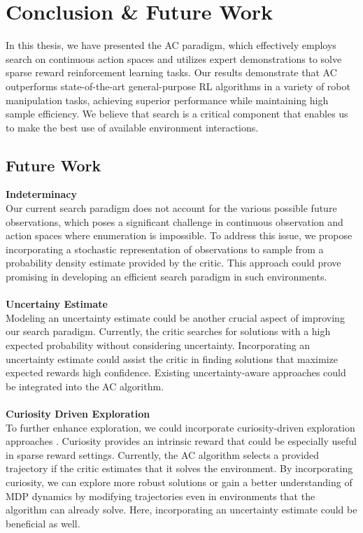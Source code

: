 
\chapter{Conclusion & Future Work}
\label{chapter:Conc_Fut}
In this thesis, we have presented the AC paradigm, which effectively employs search on continuous action spaces and utilizes 
expert demonstrations to solve sparse reward reinforcement learning tasks. Our results demonstrate that AC 
outperforms state-of-the-art general-purpose RL algorithms in a variety of robot manipulation tasks, achieving superior performance 
while maintaining high sample efficiency. We believe that search is a critical component that enables us to make the best use of available 
environment interactions.

\section{Future Work}
\textbf{Indeterminacy}\\
Our current search paradigm does not account for the various possible future observations, which poses a significant challenge in 
continuous observation and action spaces where enumeration is impossible. To address this issue, we propose incorporating a stochastic 
representation of observations to sample from a probability density estimate provided by the critic. 
This approach could prove promising in developing an efficient search paradigm in such environments. \\ \\

\textbf{Uncertainy Estimate}\\
Modeling an uncertainty estimate could be another crucial aspect of improving our search paradigm. 
Currently, the critic searches for solutions with a high expected probability without considering uncertainty. 
Incorporating an uncertainty estimate could assist the critic in finding solutions that maximize expected rewards high confidence. 
Existing uncertainty-aware approaches \cite{gawlikowski2022survey,liu2022simple} 
could be integrated into the AC algorithm.\\ \\

\textbf{Curiosity Driven Exploration}\\
To further enhance exploration, we could incorporate curiosity-driven exploration approaches \cite{pathak2017curiositydriven}. 
Curiosity provides an intrinsic reward that could be especially useful in sparse reward settings. 
Currently, the AC algorithm selects a provided trajectory if the critic estimates that it solves the environment. By incorporating curiosity, 
we can explore more robust solutions or gain a better understanding of MDP dynamics by modifying trajectories even in environments that the 
algorithm can already solve. Here, incorporating an uncertainty estimate could be beneficial as well.